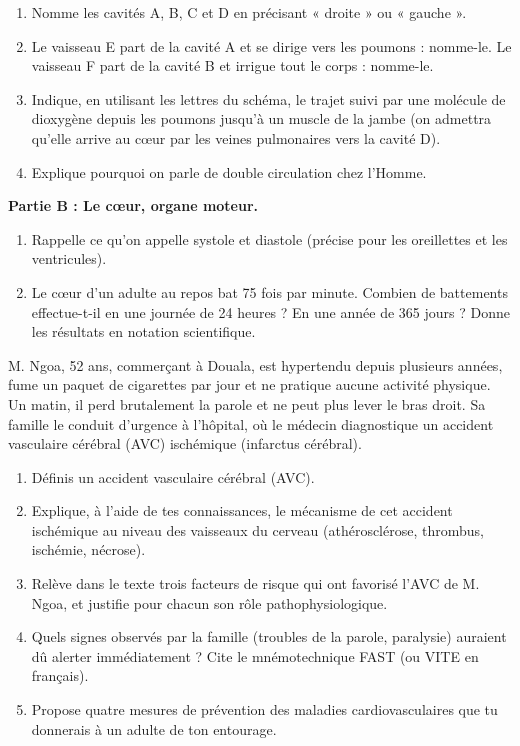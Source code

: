 \documentclass[11pt]{article}
\newcommand{\cle}[1]{{\popxbold\color{popdark}#1}}
\begin{document}
\begin{exercice}
\begin{popfigure}
\end{popfigure}
\begin{enumerate}
\item Nomme les cavités A, B, C et D en précisant « droite » ou « gauche ».
\item Le vaisseau E part de la cavité A et se dirige vers les poumons : nomme-le. Le vaisseau F part de la cavité B et irrigue tout le corps : nomme-le.
\item Indique, en utilisant les lettres du schéma, le trajet suivi par une molécule de dioxygène depuis les poumons jusqu'à un muscle de la jambe (on admettra qu'elle arrive au c\oe ur par les veines pulmonaires vers la cavité D).
\item Explique pourquoi on parle de \og double circulation \fg{} chez l'Homme.
\end{enumerate}
\textbf{Partie B : Le c\oe ur, organe moteur.}
\begin{enumerate}[resume]
\item Rappelle ce qu'on appelle \cle{systole} et \cle{diastole} (précise pour les oreillettes et les ventricules).
\item Le c\oe ur d'un adulte au repos bat 75 fois par minute. Combien de battements effectue-t-il en une journée de 24 heures ? En une année de 365 jours ? Donne les résultats en notation scientifique.
\end{enumerate}
\end{exercice}

\begin{exercice}
M. Ngoa, 52 ans, commerçant à Douala, est hypertendu depuis plusieurs années, fume un paquet de cigarettes par jour et ne pratique aucune activité physique. Un matin, il perd brutalement la parole et ne peut plus lever le bras droit. Sa famille le conduit d'urgence à l'hôpital, où le médecin diagnostique un accident vasculaire cérébral (AVC) ischémique (infarctus cérébral).
\begin{enumerate}
\item Définis un accident vasculaire cérébral (AVC).
\item Explique, à l'aide de tes connaissances, le mécanisme de cet accident ischémique au niveau des vaisseaux du cerveau (athérosclérose, thrombus, ischémie, nécrose).
\item Relève dans le texte trois facteurs de risque qui ont favorisé l'AVC de M. Ngoa, et justifie pour chacun son rôle pathophysiologique.
\item Quels signes observés par la famille (troubles de la parole, paralysie) auraient dû alerter immédiatement ? Cite le mnémotechnique FAST (ou VITE en français).
\item Propose quatre mesures de prévention des maladies cardiovasculaires que tu donnerais à un adulte de ton entourage.
\end{enumerate}
\end{exercice}
\end{document}
